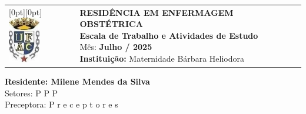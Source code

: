 \begin{flushleft}
    \begin{tabular}{@{}l l@{}}
        \raisebox{0pt}[0pt][0pt]{\includegraphics[height=2cm]{escala/recursos/ufac-logo.jpeg}} &
        \parbox[b][2cm][t]{0.82\linewidth}{
            \raggedright
            {\fontsize{11pt}{13pt}\selectfont
                \textbf{RESIDÊNCIA EM ENFERMAGEM OBSTÉTRICA} \\
                \textbf{Escala de Trabalho e Atividades de Estudo} \\
                Mês:\textbf{ Julho / 2025 }\\
                \textbf{Instituição:} Maternidade Bárbara Heliodora
            }
        }
    \end{tabular}

    {\fontsize{12pt}{14pt}\selectfont
        \textbf{Residente: Milene Mendes da Silva} \\
        Setores: P P P\\
        Preceptora: P r e c e p t o r e s
    }
\end{flushleft}